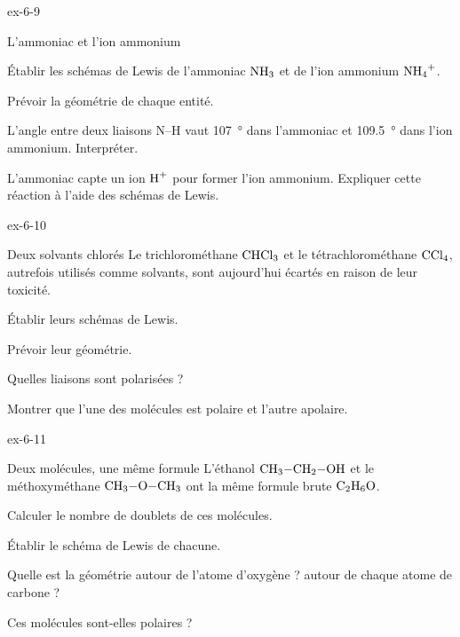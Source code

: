 \begin{blocLivre}{ex-6-9}
\begin{exercice}[2]{L'ammoniac et l'ion ammonium}
\begin{questions}
\item Établir les schémas de Lewis de l'ammoniac $\ce{NH3}$ et de l'ion ammonium $\ce{NH4+}$.
\item Prévoir la géométrie de chaque entité.
\item L'angle entre deux liaisons N--H vaut \qty{107}{\degree} dans l'ammoniac et \qty{109,5}{\degree} dans l'ion ammonium. Interpréter.
\item L'ammoniac capte un ion $\ce{H+}$ pour former l'ion ammonium. Expliquer cette réaction à l'aide des schémas de Lewis.
\end{questions}
\end{exercice}
\end{blocLivre}
\begin{blocLivre}{ex-6-10}
\begin{exercice}[2]{Deux solvants chlorés}
Le trichlorométhane $\ce{CHCl3}$ et le tétrachlorométhane $\ce{CCl4}$, autrefois utilisés comme solvants, sont aujourd'hui
écartés en raison de leur toxicité.
\begin{questions}
\item Établir leurs schémas de Lewis.
\item Prévoir leur géométrie.
\item Quelles liaisons sont polarisées ?
\item Montrer que l'une des molécules est polaire et l'autre apolaire.
\end{questions}
\end{exercice}
\end{blocLivre}
\begin{blocLivre}{ex-6-11}
\begin{exercice}[2]{Deux molécules, une même formule}
L'éthanol $\ce{CH3-CH2-OH}$ et le méthoxyméthane $\ce{CH3-O-CH3}$ ont la même formule brute $\ce{C2H6O}$.
\begin{questions}
\item Calculer le nombre de doublets de ces molécules.
\item Établir le schéma de Lewis de chacune.
\item Quelle est la géométrie autour de l'atome d'oxygène ? autour de chaque atome de carbone ?
\item Ces molécules sont-elles polaires ?
\end{questions}
\end{exercice}
\end{blocLivre}
